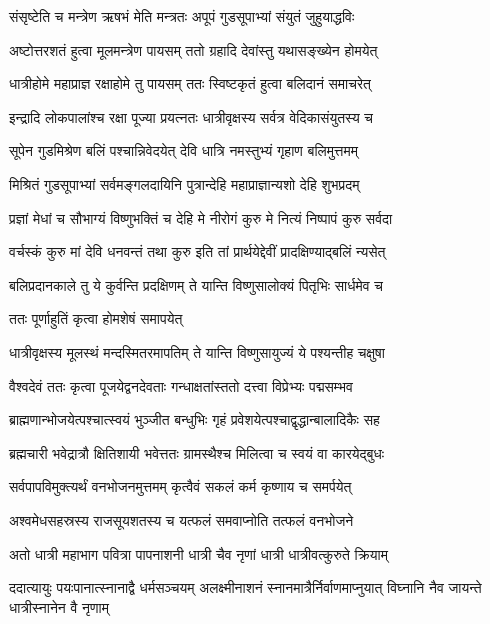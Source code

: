 \twolineshloka
{संसृष्टेति च मन्त्रेण ऋषभं मेति मन्त्रतः}
{अपूपं गुडसूपाभ्यां संयुतं जुहुयाद्धविः} %

\twolineshloka
{अष्टोत्तरशतं हुत्वा मूलमन्त्रेण पायसम्}
{ततो ग्रहादि देवांस्तु यथासङ्ख्येन होमयेत्} %

\twolineshloka
{धात्रीहोमे महाप्राज्ञ रक्षाहोमे तु पायसम्}
{ततः स्विष्टकृतं हुत्वा बलिदानं समाचरेत्} %

\twolineshloka
{इन्द्रादि लोकपालांश्च रक्षा पूज्या प्रयत्नतः}
{धात्रीवृक्षस्य सर्वत्र वेदिकासंयुतस्य च} %

\twolineshloka
{सूपेन गुडमिश्रेण बलिं पश्चान्निवेदयेत्}
{देवि धात्रि नमस्तुभ्यं गृहाण बलिमुत्तमम्} %

\twolineshloka
{मिश्रितं गुडसूपाभ्यां सर्वमङ्गलदायिनि}
{पुत्रान्देहि महाप्राज्ञान्यशो देहि शुभप्रदम्} %

\twolineshloka
{प्रज्ञां मेधां च सौभाग्यं विष्णुभक्तिं च देहि मे}
{नीरोगं कुरु मे नित्यं निष्पापं कुरु सर्वदा} %

\twolineshloka
{वर्चस्कं कुरु मां देवि धनवन्तं तथा कुरु}
{इति तां प्रार्थयेद्देवीं प्रादक्षिण्याद्बलिं न्यसेत्} %

\twolineshloka
{बलिप्रदानकाले तु ये कुर्वन्ति प्रदक्षिणम्}
{ते यान्ति विष्णुसालोक्यं पितृभिः सार्धमेव च} %


\onelineshloka
{ततः पूर्णाहुतिं कृत्वा होमशेषं समापयेत्} %

\twolineshloka
{धात्रीवृक्षस्य मूलस्थं मन्दस्मितरमापतिम्}
{ते यान्ति विष्णुसायुज्यं ये पश्यन्तीह चक्षुषा} %

\twolineshloka
{वैश्वदेवं ततः कृत्वा पूजयेद्वनदेवताः}
{गन्धाक्षतांस्ततो दत्त्वा विप्रेभ्यः पद्मसम्भव} %

\twolineshloka
{ब्राह्मणान्भोजयेत्पश्चात्स्वयं भुञ्जीत बन्धुभिः}
{गृहं प्रवेशयेत्पश्चाद्वृद्धान्बालादिकैः सह} %

\twolineshloka
{ब्रह्मचारी भवेद्रात्रौ क्षितिशायी भवेत्ततः}
{ग्रामस्थैश्च मिलित्वा च स्वयं वा कारयेद्बुधः} %

\twolineshloka
{सर्वपापविमुक्त्यर्थं वनभोजनमुत्तमम्}
{कृत्वैवं सकलं कर्म कृष्णाय च समर्पयेत्} %

\twolineshloka
{अश्वमेधसहस्रस्य राजसूयशतस्य च}
{यत्फलं समवाप्नोति तत्फलं वनभोजने} %

\twolineshloka
{अतो धात्री महाभाग पवित्रा पापनाशनी}
{धात्री चैव नृणां धात्री धात्रीवत्कुरुते क्रियाम्} %

\threelineshloka
{ददात्यायुः पयःपानात्स्नानाद्वै धर्मसञ्चयम्}
{अलक्ष्मीनाशनं स्नानमात्रैर्निर्वाणमाप्नुयात्}
{विघ्नानि नैव जायन्ते धात्रीस्नानेन वै नृणाम्} %

